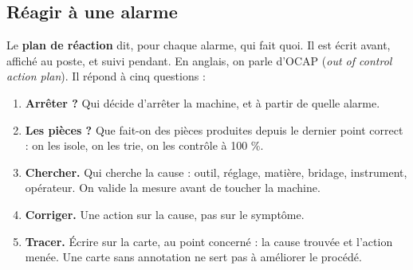 \documentclass[11pt,a4paper]{article}
\begin{document}
\subsection{Réagir à une alarme}\label{sec:reagir}
Le \textbf{plan de réaction} dit, pour chaque alarme, qui fait quoi. Il est écrit avant, affiché au poste, et suivi pendant. En anglais, on parle d'OCAP (\emph{out of control action plan}). Il répond à cinq questions :
\begin{enumerate}[nosep]
\item \textbf{Arrêter ?} Qui décide d'arrêter la machine, et à partir de quelle alarme.
\item \textbf{Les pièces ?} Que fait-on des pièces produites depuis le dernier point correct : on les isole, on les trie, on les contrôle à 100 \%.
\item \textbf{Chercher.} Qui cherche la cause : outil, réglage, matière, bridage, instrument, opérateur. On valide la mesure avant de toucher la machine.
\item \textbf{Corriger.} Une action sur la cause, pas sur le symptôme.
\item \textbf{Tracer.} Écrire sur la carte, au point concerné : la cause trouvée et l'action menée. Une carte sans annotation ne sert pas à améliorer le procédé.
\end{enumerate}
\end{document}
